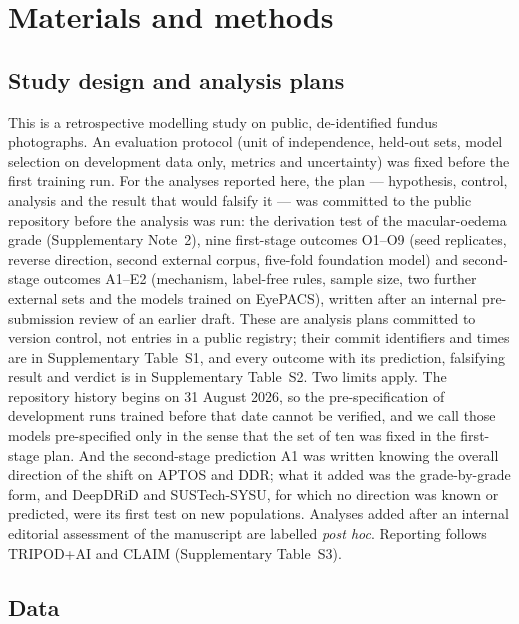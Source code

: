 \section{Materials and methods}\label{sec:methods}

\subsection{Study design and analysis plans}

This is a retrospective modelling study on public, de-identified fundus photographs. An
evaluation protocol (unit of independence, held-out sets, model selection on development data
only, metrics and uncertainty) was fixed before the first training run. For the analyses
reported here, the plan --- hypothesis, control, analysis and the result that would falsify
it --- was committed to the public repository before the analysis was run: the derivation test
of the macular-oedema grade (Supplementary Note~2), nine first-stage outcomes O1--O9 (seed
replicates, reverse direction, second external corpus, five-fold foundation model) and
second-stage outcomes A1--E2 (mechanism, label-free rules, sample size, two further external sets
and the models trained on EyePACS), written after an internal pre-submission review of an earlier
draft. These are analysis plans committed to version control, not entries in a public registry;
their commit identifiers and times are in Supplementary Table~S1, and every outcome with its
prediction, falsifying result and verdict is in Supplementary Table~S2. Two limits apply. The
repository history begins on 31 August 2026, so the pre-specification of development runs trained
before that date cannot be verified, and we call those models pre-specified only in the sense that
the set of ten was fixed in the first-stage plan. And the second-stage prediction A1 was written
knowing the overall direction of the shift on APTOS and DDR; what it added was the grade-by-grade
form, and DeepDRiD and SUSTech-SYSU, for which no direction was known or predicted, were its first
test on new populations. Analyses added after an internal editorial assessment of the manuscript
are labelled \emph{post hoc}. Reporting follows TRIPOD+AI\cite{collins2024tripodai} and
CLAIM\cite{tejani2024claim} (Supplementary Table~S3).

\subsection{Data}

